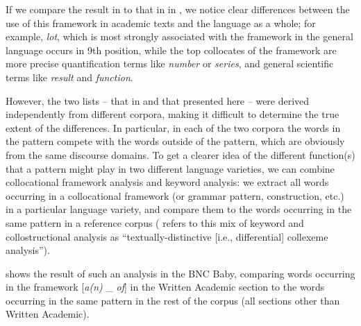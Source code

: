 
If we compare the result in  to that in  in , we notice clear differences between the use of this framework  in academic  texts and the language as a whole; for example, \textit{lot}, which is most strongly associated  with the framework in the general language occurs in 9th position, while the top collocates  of the framework  are more precise quantification  terms like \textit{number} or \textit{series}, and general scientific terms like \textit{result} and \textit{function}.

However, the two lists -- that in  and that presented here -- were derived independently from different corpora, making it difficult to determine the true extent of the differences. In particular, in each of the two corpora the words in the pattern compete with the words outside of the pattern, which are obviously from the same discourse domains. To get a clearer idea of the different function(s) that a pattern might play in two different language varieties,  we can combine collocational  framework  analysis and keyword  analysis: we extract  all words occurring in a collocational framework (or grammar  pattern,  construction, etc.) in a particular language variety,  and compare them to the words occurring in the same pattern in a reference corpus (\citealt{stefanowitsch_lot_2017} refers to this mix of keyword  and collostructional  analysis as ``textually\hyp{}distinctive [i.e., differential] collexeme  analysis'').

 shows the result of such an analysis in the BNC Baby,  comparing words occurring in the framework  [\textit{a(n)} \_ \textit{of}] in the Written Academic  section to the words occurring in the same pattern in the rest of the corpus (all sections other than Written Academic).

